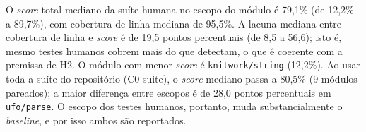 O \textit{score} total mediano da suíte humana no escopo do módulo é 79,1\% (de 12,2\% a 89,7\%), com cobertura de linha mediana de 95,5\%. A lacuna mediana entre cobertura de linha e \textit{score} é de 19,5 pontos percentuais (de 8,5 a 56,6); isto é, mesmo testes humanos cobrem mais do que detectam, o que é coerente com a premissa de H2. O módulo com menor \textit{score} é \texttt{knitwork/string} (12,2\%). Ao usar toda a suíte do repositório (C0-suite), o \textit{score} mediano passa a 80,5\% (9 módulos pareados); a maior diferença entre escopos é de 28,0 pontos percentuais em \texttt{ufo/parse}. O escopo dos testes humanos, portanto, muda substancialmente o \textit{baseline}, e por isso ambos são reportados.
